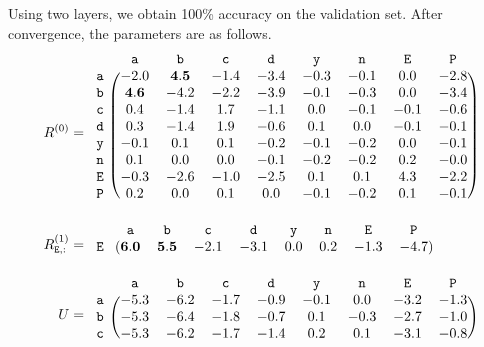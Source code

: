 \documentclass{article}
\newcommand{\ta}{\mathtt{a}}
\newcommand{\tb}{\mathtt{b}}
\newcommand{\tc}{\mathtt{c}}
\newcommand{\td}{\mathtt{d}}
\newcommand{\tn}{\mathtt{n}}
\newcommand{\ty}{\mathtt{y}}
\newcommand{\tE}{\mathtt{E}}
\newcommand{\tP}{\mathtt{P}}
\begin{document}
Using two layers, we obtain 100\% accuracy on the validation
set. After convergence, the parameters are as follows.
\begin{displaymath}
  \begin{aligned}
  R^{(0)} &=
  \begin{blockarray}{ccccccccc}
       & \ta & \tb & \tc & \td & \ty & \tn & \tE & \tP  \\
      \begin{block}{r(cccccccc)}
        \ta & -2.0 & \mathbf{4.5} & -1.4 & -3.4 & -0.3 & -0.1 & 0.0 & -2.8 \\
        \tb & \mathbf{4.6} & -4.2 & -2.2 & -3.9 & -0.1 & -0.3 & 0.0 & -3.4 \\
        \tc & 0.4 & -1.4 & 1.7 & -1.1 & 0.0 & -0.1 & -0.1 & -0.6 \\
        \td & 0.3 & -1.4 & 1.9 & -0.6 & 0.1 & 0.0 & -0.1 & -0.1 \\
        \ty & -0.1 & 0.1 & 0.1 & -0.2 & -0.1 & -0.2 & 0.0 & -0.1 \\
        \tn & 0.1 & 0.0 & 0.0 & -0.1 & -0.2 & -0.2 & 0.2 & -0.0 \\
        \tE & -0.3 & -2.6 & -1.0 & -2.5 & 0.1 & 0.1 & 4.3 & -2.2 \\
        \tP & 0.2 & 0.0 & 0.1 & 0.0 & -0.1 & -0.2 & 0.1 & -0.1 \\
      \end{block}
    \end{blockarray} \\
  R^{(1)}_{\tE,:} &= 
  \begin{blockarray}{ccccccccc}
       & \ta & \tb & \tc & \td & \ty & \tn & \tE & \tP  \\
      \begin{block}{r(cccccccc)}
        \tE & \mathbf{6.0} & \mathbf{5.5} & -2.1 & -3.1 & 0.0 & 0.2 & -1.3 & -4.7 \\
      \end{block}
    \end{blockarray} \\
    U &=
  \begin{blockarray}{ccccccccc}
       & \ta & \tb & \tc & \td & \ty & \tn & \tE & \tP  \\
      \begin{block}{r(cccccccc)}
        \ta & -5.3 & -6.2 & -1.7 & -0.9 & -0.1 & 0.0 & -3.2 & -1.3 \\
        \tb & -5.3 & -6.4 & -1.8 & -0.7 & 0.1 & -0.3 & -2.7 & -1.0 \\
        \tc & -5.3 & -6.2 & -1.7 & -1.4 & 0.2 & 0.1 & -3.1 & -0.8 \\

\end{block}
\end{blockarray}
\end{aligned}
\end{displaymath}
\end{document}
